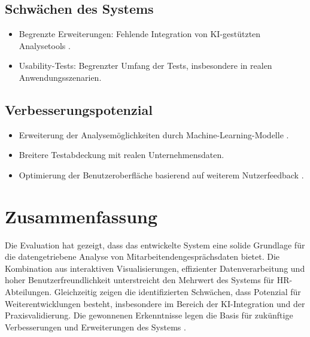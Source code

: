 \subsection{Schw\"achen des Systems}
\begin{itemize}
    \item Begrenzte Erweiterungen: Fehlende Integration von KI-gest\"utzten Analysetools \cite{tambe2019artificial}.
    \item Usability-Tests: Begrenzter Umfang der Tests, insbesondere in realen Anwendungsszenarien.
\end{itemize}

\subsection{Verbesserungspotenzial}
\begin{itemize}
    \item Erweiterung der Analysem\"oglichkeiten durch Machine-Learning-Modelle \cite{aral2012threeway}.
    \item Breitere Testabdeckung mit realen Unternehmensdaten.
    \item Optimierung der Benutzeroberfl\"ache basierend auf weiterem Nutzerfeedback \cite{sedlmair2011information}.
\end{itemize}

\section{Zusammenfassung}
Die Evaluation hat gezeigt, dass das entwickelte System eine solide Grundlage f\"ur die datengetriebene Analyse von Mitarbeitendengespr\"achs\-daten bietet. Die Kombination aus interaktiven Visualisierungen, effizienter Datenverarbeitung und hoher Benutzerfreundlichkeit unterstreicht den Mehrwert des Systems f\"ur HR-Abteilungen. Gleichzeitig zeigen die identifizierten Schw\"achen, dass Potenzial f\"ur Weiterentwicklungen besteht, insbesondere im Bereich der KI-Integration und der Praxisvalidierung. Die gewonnenen Erkenntnisse legen die Basis f\"ur zuk\"unftige Verbesserungen und Erweiterungen des Systems \cite{burnett2021future}.
